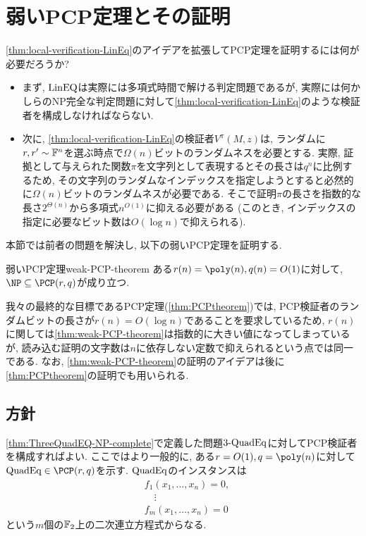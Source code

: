 \section{弱いPCP定理とその証明}
\cref{thm:local-verification-LinEq}のアイデアを拡張してPCP定理を証明するには何が必要だろうか?
\begin{itemize}
  \item まず, $\text{LinEQ}$は実際には多項式時間で解ける判定問題であるが, 実際には何かしらのNP完全な判定問題に対して\cref{thm:local-verification-LinEq}のような検証者を構成しなければならない.  
  \item 次に, \cref{thm:local-verification-LinEq}の検証者$V^\pi(M,z)$は, ランダムに$r,r'\sim\mathbb{F}^n$を選ぶ時点で$\Omega(n)$ビットのランダムネスを必要とする. 実際, 証拠として与えられた関数$\pi$を文字列として表現するとその長さは$q^n$に比例するため, その文字列のランダムなインデックスを指定しようとすると必然的に$\Omega(n)$ビットのランダムネスが必要である. そこで証明$\pi$の長さを指数的な長さ$2^{\Theta(n)}$から多項式$n^{O(1)}$に抑える必要がある (このとき, インデックスの指定に必要なビット数は$O(\log n)$で抑えられる).
\end{itemize}

本節では前者の問題を解決し, 以下の弱いPCP定理を証明する.
\begin{theorem}{弱いPCP定理}{weak-PCP-theorem}
  ある$r(n)=\poly(n),q(n)=O(1)$に対して, $\NP \subseteq \PCP(r,q)$が成り立つ.
\end{theorem}

我々の最終的な目標であるPCP定理(\cref{thm:PCPtheorem})では, PCP検証者のランダムビットの長さが$r(n)=O(\log n)$であることを要求しているため, $r(n)$に関しては\cref{thm:weak-PCP-theorem}は指数的に大きい値になってしまっているが, 読み込む証明の文字数は$n$に依存しない定数で抑えられるという点では同一である.
なお, \cref{thm:weak-PCP-theorem}の証明のアイデアは後に\cref{thm:PCPtheorem}の証明でも用いられる.

\subsection{方針}
  \cref{thm:ThreeQuadEQ-NP-complete}で定義した問題$\text{3-QuadEq}$に対してPCP検証者を構成すればよい.
  ここではより一般的に, ある$r=O(1),q=\poly(n)$に対して$\QuadEQ\in\PCP(r,q)$を示す.
  $\text{QuadEq}$のインスタンスは
  \begin{align*}
    &f_1(x_1,\dots,x_n) = 0,\\
    &\quad\vdots\\
    &f_m(x_1,\dots,x_n) = 0
  \end{align*}
  という$m$個の$\mathbb{F}_2$上の二次連立方程式からなる.
  
